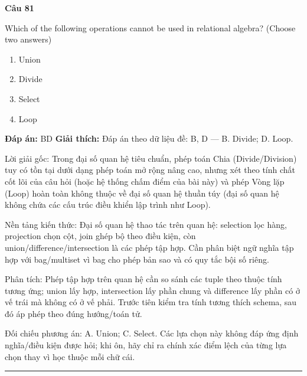 \documentclass[11pt,a4paper]{article}
\newenvironment{question}[1]{%
  \par\vspace{1em}\noindent\textbf{\large Câu #1}\par\vspace{0.4em}
}{%
  \par\vspace{1em}\hrule\vspace{0.6em}
}
\newenvironment{choices}{%
  \begin{enumerate}[label=\textbf{\Alph*.},leftmargin=2.2em,itemsep=2pt,topsep=3pt]
}{%
  \end{enumerate}
}
\newcommand{\choice}{\item}
\begin{document}
\begin{question}{81}
Which of the following operations cannot be used in relational algebra? (Choose two answers)
\begin{choices}
\choice Union
\choice Divide
\choice Select
\choice Loop
\end{choices}
\textbf{Đáp án:} BD
\textbf{Giải thích:} Đáp án theo dữ liệu đề: B, D — B. Divide; D. Loop.

Lời giải gốc: Trong đại số quan hệ tiêu chuẩn, phép toán Chia (Divide/Division) tuy có tồn tại dưới dạng phép toán mở rộng nâng cao, nhưng xét theo tính chất cốt lõi của câu hỏi (hoặc hệ thống chấm điểm của bài này) và phép Vòng lặp (Loop) hoàn toàn không thuộc về đại số quan hệ thuần túy (đại số quan hệ không chứa các cấu trúc điều khiển lập trình như Loop).

Nền tảng kiến thức: Đại số quan hệ thao tác trên quan hệ: selection lọc hàng, projection chọn cột, join ghép bộ theo điều kiện, còn union/difference/intersection là các phép tập hợp. Cần phân biệt ngữ nghĩa tập hợp với bag/multiset vì bag cho phép bản sao và có quy tắc bội số riêng.

Phân tích: Phép tập hợp trên quan hệ cần so sánh các tuple theo thuộc tính tương ứng; union lấy hợp, intersection lấy phần chung và difference lấy phần có ở vế trái mà không có ở vế phải. Trước tiên kiểm tra tính tương thích schema, sau đó áp phép theo đúng hướng/toán tử.

Đối chiếu phương án: A. Union; C. Select. Các lựa chọn này không đáp ứng định nghĩa/điều kiện được hỏi; khi ôn, hãy chỉ ra chính xác điểm lệch của từng lựa chọn thay vì học thuộc mỗi chữ cái.
\end{question}
\end{document}
